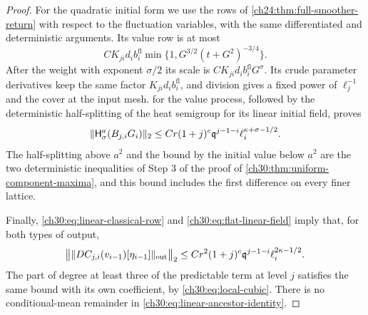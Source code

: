 \begin{proof}
For the quadratic initial form we use the rows of \cref{ch24:thm:full-smoother-return} with respect to the fluctuation variables, with the same differentiated and deterministic arguments. Its value row is at most
\[
 CK_{ji}d_ib_i^{\mathrm{fl}}\min\bigl\{1,G^{3/2}(t+G^2)^{-3/4}\bigr\}.
\]
After the weight with exponent $\sigma/2$ its scale is $CK_{ji}d_ib_i^{\mathrm{fl}}G^\sigma$. Its crude parameter derivatives keep the same factor $K_{ji}d_ib_i^{\mathrm{fl}}$, and division gives a fixed power of $\ell_j^{-1}$ and the cover at the input mesh.  for the value process, followed by the deterministic half-splitting of the heat semigroup for its linear initial field, proves
\begin{equation}\label{ch30:eq:linear-static-innovation}
 \lVert \mathsf H_\sigma^a(B_{j,i}G_i)\rVert_2\le Cr(1+j)^c\mathfrak q^{j-1-i}\ell_i^{\kappa+\sigma-1/2}.
\end{equation}
The half-splitting above $a^2$ and the bound by the initial value below $a^2$ are the two deterministic inequalities of Step 3 of the proof of \cref{ch30:thm:uniform-component-maxima}, and this bound includes the first difference on every finer lattice.

Finally, \eqref{ch30:eq:linear-classical-row} and \eqref{ch30:eq:flat-linear-field} imply that, for both types of output,
\begin{equation}\label{ch30:eq:linear-cubic-sum}
 \bigl\lVert\lVert DC_{j,i}(v_{i-1})[\eta_{i-1}]\rVert_{\mathrm{out}}\bigr\rVert_2\le Cr^2(1+j)^c\mathfrak q^{j-1-i}\ell_i^{2\kappa-1/2}.
\end{equation}
The part of degree at least three of the predictable term at level $j$ satisfies the same bound with its own coefficient, by \eqref{ch30:eq:local-cubic}. There is no conditional-mean remainder in \eqref{ch30:eq:linear-ancestor-identity}.


\end{proof}
